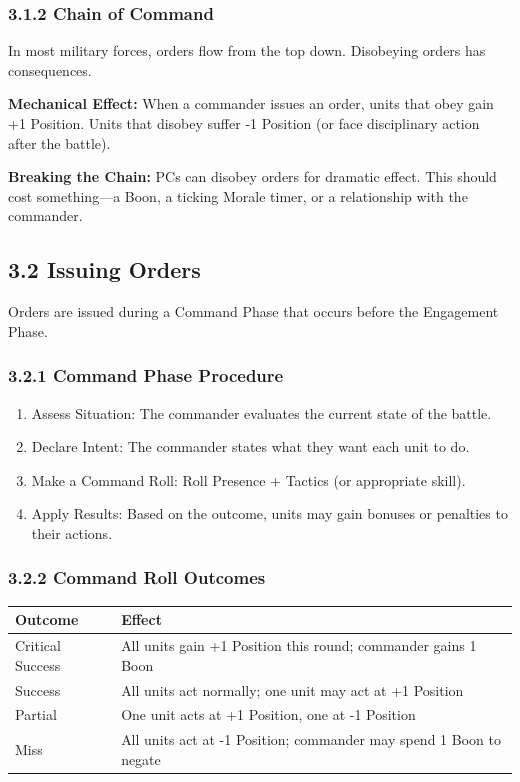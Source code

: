 \documentclass[11pt]{article}
\begin{document}
\subsubsection{3.1.2 Chain of Command}

In most military forces, orders flow from the top down. Disobeying orders has consequences.

\textbf{Mechanical Effect:} When a commander issues an order, units that obey gain +1 Position. Units that disobey suffer -1 Position (or face disciplinary action after the battle).

\textbf{Breaking the Chain:} PCs can disobey orders for dramatic effect. This should cost something—a Boon, a ticking Morale timer, or a relationship with the commander.

\subsection{3.2 Issuing Orders}

Orders are issued during a Command Phase that occurs before the Engagement Phase.

\subsubsection{3.2.1 Command Phase Procedure}

\begin{enumerate}
  \item Assess Situation: The commander evaluates the current state of the battle.
  \item Declare Intent: The commander states what they want each unit to do.
  \item Make a Command Roll: Roll Presence + Tactics (or appropriate skill).
  \item Apply Results: Based on the outcome, units may gain bonuses or penalties to their actions.
\end{enumerate}

\subsubsection{3.2.2 Command Roll Outcomes}

\begin{tabular}{|l|l|}
\hline
Outcome & Effect \\
\hline
Critical Success & All units gain +1 Position this round; commander gains 1 Boon \\
\hline
Success & All units act normally; one unit may act at +1 Position \\
\hline
Partial & One unit acts at +1 Position, one at -1 Position \\
\hline
Miss & All units act at -1 Position; commander may spend 1 Boon to negate \\
\hline
\end{tabular}
\end{document}
